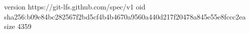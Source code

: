 version https://git-lfs.github.com/spec/v1
oid sha256:b09e84bc282567f2bd5cf4b4b4670a9560a440d217f20478a845e55e8fccc2ea
size 4359
